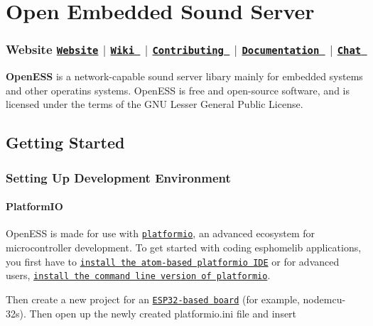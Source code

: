    \section*{Open Embedded Sound Server}

 \subsubsection*{Website \href{https://roseleblood.github.io/}{\tt Website}  $\vert$  \href{https://github.com/RoseLeBlood/openess/wiki}{\tt Wiki }  $\vert$  \href{https://github.com/RoseLeBlood/openess/blob/master/CONTRIBUTING.md}{\tt Contributing }  $\vert$  \href{https://roseleblood.github.io/openess/html/d3/dcc/md__r_e_a_d_m_e.html}{\tt Documentation }  $\vert$  \href{https://webchat.freenode.net/?channels=openess}{\tt Chat } }



 



{\bfseries Open\+E\+SS} is a network-\/capable sound server libary mainly for embedded systems and other operatins systems. Open\+E\+SS is free and open-\/source software, and is licensed under the terms of the G\+NU Lesser General Public License.

\subsection*{Getting Started}

\subsubsection*{Setting Up Development Environment}

\paragraph*{Platform\+IO}

Open\+E\+SS is made for use with \href{http://platformio.org/}{\tt platformio}, an advanced ecosystem for microcontroller development. To get started with coding esphomelib applications, you first have to \href{http://platformio.org/platformio-ide}{\tt install the atom-\/based platformio I\+DE} or for advanced users, \href{http://docs.platformio.org/en/latest/installation.html}{\tt install the command line version of platformio}.

Then create a new project for an \href{http://docs.platformio.org/en/latest/platforms/espressif32.html#boards}{\tt E\+S\+P32-\/based board} (for example, {\ttfamily nodemcu-\/32s}). Then open up the newly created {\ttfamily platformio.\+ini} file and insert


